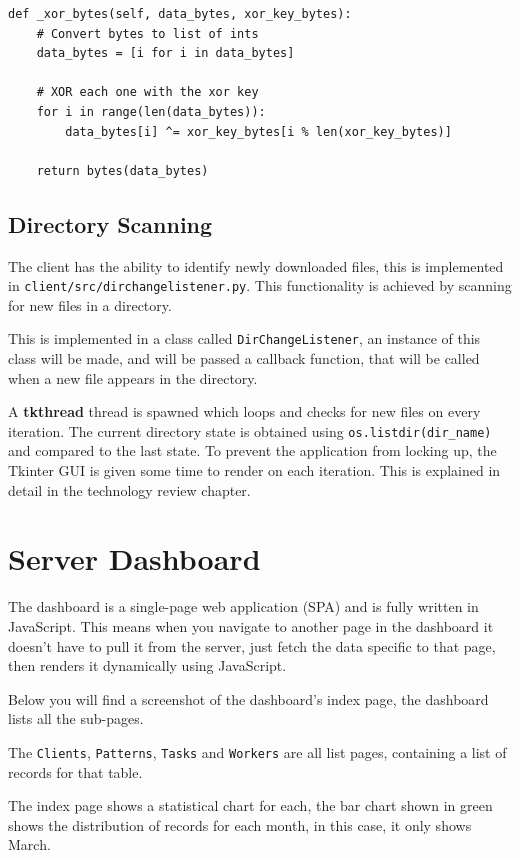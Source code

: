 \begin{lstlisting}
def _xor_bytes(self, data_bytes, xor_key_bytes):
    # Convert bytes to list of ints
    data_bytes = [i for i in data_bytes]

    # XOR each one with the xor key
    for i in range(len(data_bytes)):
        data_bytes[i] ^= xor_key_bytes[i % len(xor_key_bytes)]

    return bytes(data_bytes)
\end{lstlisting}

\subsection{Directory Scanning}
The client has the ability to identify newly downloaded files,
this is implemented in \texttt{client/src/dirchangelistener.py}.
This functionality is achieved by scanning for new files in a directory.

This is implemented in a class called \texttt{DirChangeListener},
an instance of this class will be made, and will be passed a callback function,
that will be called when a new file appears in the directory.

A \textbf{tkthread} thread is spawned which loops
and checks for new files on every iteration.
The current directory state is obtained using
\texttt{os.listdir(dir\_name)} and compared to the last state.
To prevent the application from locking up,
the Tkinter GUI is given some time to render on each iteration.
This is explained in detail in the technology review chapter.

\section{Server Dashboard}
The dashboard is a single-page web application (SPA)
and is fully written in JavaScript.
This means when you navigate to another page in the dashboard
it doesn't have to pull it from the server,
just fetch the data specific to that page,
then renders it dynamically using JavaScript.

Below you will find a screenshot of the dashboard's index page,
the dashboard lists all the sub-pages.

The \texttt{Clients}, \texttt{Patterns}, \texttt{Tasks} and \texttt{Workers} are all
list pages, containing a list of records for that table.

The index page shows a statistical chart for each,
the bar chart shown in green shows the distribution of records for each month,
in this case, it only shows March.

